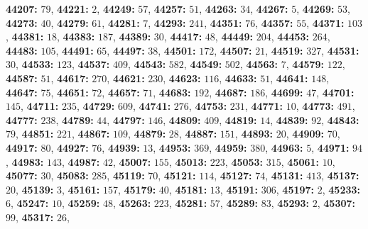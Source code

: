 \textsf{\bfseries 44207:} $79$, \textsf{\bfseries 44221:} $2$, \textsf{\bfseries 44249:} $57$, \textsf{\bfseries 44257:} $51$, \textsf{\bfseries 44263:} $34$, \textsf{\bfseries 44267:} $5$, \textsf{\bfseries 44269:} $53$, \textsf{\bfseries 44273:} $40$, \textsf{\bfseries 44279:} $61$, \textsf{\bfseries 44281:} $7$, \textsf{\bfseries 44293:} $241$, \textsf{\bfseries 44351:} $76$, \textsf{\bfseries 44357:} $55$, \textsf{\bfseries 44371:} $103$, \textsf{\bfseries 44381:} $18$, \textsf{\bfseries 44383:} $187$, \textsf{\bfseries 44389:} $30$, \textsf{\bfseries 44417:} $48$, \textsf{\bfseries 44449:} $204$, \textsf{\bfseries 44453:} $264$, \textsf{\bfseries 44483:} $105$, \textsf{\bfseries 44491:} $65$, \textsf{\bfseries 44497:} $38$, \textsf{\bfseries 44501:} $172$, \textsf{\bfseries 44507:} $21$, \textsf{\bfseries 44519:} $327$, \textsf{\bfseries 44531:} $30$, \textsf{\bfseries 44533:} $123$, \textsf{\bfseries 44537:} $409$, \textsf{\bfseries 44543:} $582$, \textsf{\bfseries 44549:} $502$, \textsf{\bfseries 44563:} $7$, \textsf{\bfseries 44579:} $122$, \textsf{\bfseries 44587:} $51$, \textsf{\bfseries 44617:} $270$, \textsf{\bfseries 44621:} $230$, \textsf{\bfseries 44623:} $116$, \textsf{\bfseries 44633:} $51$, \textsf{\bfseries 44641:} $148$, \textsf{\bfseries 44647:} $75$, \textsf{\bfseries 44651:} $72$, \textsf{\bfseries 44657:} $71$, \textsf{\bfseries 44683:} $192$, \textsf{\bfseries 44687:} $186$, \textsf{\bfseries 44699:} $47$, \textsf{\bfseries 44701:} $145$, \textsf{\bfseries 44711:} $235$, \textsf{\bfseries 44729:} $609$, \textsf{\bfseries 44741:} $276$, \textsf{\bfseries 44753:} $231$, \textsf{\bfseries 44771:} $10$, \textsf{\bfseries 44773:} $491$, \textsf{\bfseries 44777:} $238$, \textsf{\bfseries 44789:} $44$, \textsf{\bfseries 44797:} $146$, \textsf{\bfseries 44809:} $409$, \textsf{\bfseries 44819:} $14$, \textsf{\bfseries 44839:} $92$, \textsf{\bfseries 44843:} $79$, \textsf{\bfseries 44851:} $221$, \textsf{\bfseries 44867:} $109$, \textsf{\bfseries 44879:} $28$, \textsf{\bfseries 44887:} $151$, \textsf{\bfseries 44893:} $20$, \textsf{\bfseries 44909:} $70$, \textsf{\bfseries 44917:} $80$, \textsf{\bfseries 44927:} $76$, \textsf{\bfseries 44939:} $13$, \textsf{\bfseries 44953:} $369$, \textsf{\bfseries 44959:} $380$, \textsf{\bfseries 44963:} $5$, \textsf{\bfseries 44971:} $94$, \textsf{\bfseries 44983:} $143$, \textsf{\bfseries 44987:} $42$, \textsf{\bfseries 45007:} $155$, \textsf{\bfseries 45013:} $223$, \textsf{\bfseries 45053:} $315$, \textsf{\bfseries 45061:} $10$, \textsf{\bfseries 45077:} $30$, \textsf{\bfseries 45083:} $285$, \textsf{\bfseries 45119:} $70$, \textsf{\bfseries 45121:} $114$, \textsf{\bfseries 45127:} $74$, \textsf{\bfseries 45131:} $413$, \textsf{\bfseries 45137:} $20$, \textsf{\bfseries 45139:} $3$, \textsf{\bfseries 45161:} $157$, \textsf{\bfseries 45179:} $40$, \textsf{\bfseries 45181:} $13$, \textsf{\bfseries 45191:} $306$, \textsf{\bfseries 45197:} $2$, \textsf{\bfseries 45233:} $6$, \textsf{\bfseries 45247:} $10$, \textsf{\bfseries 45259:} $48$, \textsf{\bfseries 45263:} $223$, \textsf{\bfseries 45281:} $57$, \textsf{\bfseries 45289:} $83$, \textsf{\bfseries 45293:} $2$, \textsf{\bfseries 45307:} $99$, \textsf{\bfseries 45317:} $26$, 
